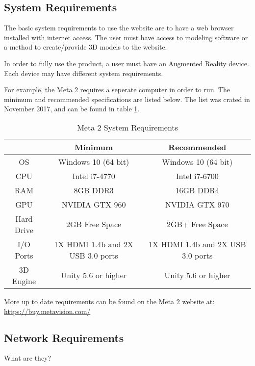 \subsection{System  Requirements}

The basic system requirements to use the website are to have a web browser installed with internet access.  The user must have access to modeling software or a method to create/provide 3D models to the website.

In order to fully use the product, a user must have an Augmented Reality device.  Each device may have different system requirements.

For example, the Meta 2 requires a seperate computer in order to run.  The minimum and recommended specifications are listed below.  The list was crated in November 2017, and can be found in table \ref{table:metatwosystemrequirements}.


\begin{table}[H]
	\centering
	\begin{tabular}{ | c | c | c | }
		\hline
		& Minimum & Recommended \\ \hline
		OS & Windows 10 (64 bit) & 	Windows 10 (64 bit) \\ \hline
		CPU & Intel i7-4770 & Intel i7-6700 \\ \hline
		RAM & 8GB DDR3 & 16GB DDR4 \\ \hline
		GPU & NVIDIA GTX 960 & NVIDIA GTX 970 \\ \hline
		Hard Drive & 2GB Free Space & 2GB+ Free Space \\ \hline
		I/O Ports & 1X HDMI 1.4b and 2X USB 3.0 ports & 1X HDMI 1.4b and 2X USB 3.0 ports \\ \hline
		3D Engine & Unity 5.6 or higher & Unity 5.6 or higher \\ \hline
	\end{tabular}
	
	\caption{Meta 2 System Requirements}
	\label{table:metatwosystemrequirements}
\end{table}

More up to date requirements can be found on the Meta 2 website at: \url{https://buy.metavision.com/}

\subsection{Network Requirements}
What are they? 


